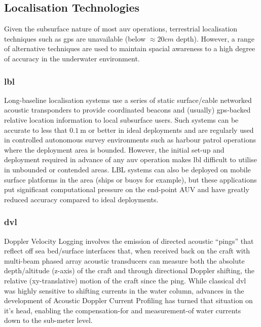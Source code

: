 \subsection{Localisation Technologies}

Given the subsurface nature of most \gls{auv} operations, terrestrial localisation techniques such as \gls{gps} are unavailable (below $\approx 20cm$ depth). 
However, a range of alternative techniques are used to maintain spacial awareness to a high degree of accuracy in the underwater environment.
\subsubsection{\gls{lbl}}
Long-baseline localisation systems use a series of static surface/cable networked acoustic transponders to provide coordinated beacons and (usually) \gls{gps}-backed relative location information to local subsurface users. 
Such systems can be accurate to less that $0.\SI{1}{\meter}$ or better in ideal deployments and are regularly used in controlled autonomous survey environments such as harbour patrol operations where the deployment area is bounded. 
However, the initial set-up and deployment required in advance of any \gls{auv} operation makes \gls{lbl} difficult to utilise in unbounded or contended areas.
LBL systems can also be deployed on mobile surface platforms in the area (ships or buoys for example), but these applications put significant computational pressure on the end-point AUV and have greatly reduced accuracy compared to ideal deployments\cite{Matos1999}.
\subsubsection{\gls{dvl}}
Doppler Velocity Logging involves the emission of directed acoustic ``pings'' that reflect off sea bed/surface interfaces that, when received back on the craft with multi-beam phased array acoustic transducers can measure both the absolute depth/altitude (z-axis) of the craft and through directional Doppler shifting, the relative (xy-translative) motion of the craft since the ping.
While classical \gls{dvl} was highly sensitive to shifting currents in the water column, advances in the development of Acoustic Doppler Current Profiling has turned that situation on it's head, enabling the compensation-for and measurement-of water currents down to the sub-meter level\cite{Snyder2010}.
